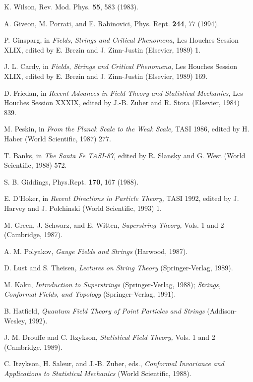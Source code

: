 \begin{thebibliography}{99}

\baselineskip=16pt

 K. Wilson, Rev.
Mod. Phys. {\bf 55}, 583 (1983).

 A. Giveon, M. Porrati, and E. Rabinovici,
Phys. Rept. {\bf 244}, 77 (1994).

 P. Ginsparg, in
{\it Fields, Strings and Critical Phenomena,} Les Houches
Session XLIX, edited by E. Brezin and J. Zinn-Justin
(Elsevier, 1989) 1.

 J. L. Cardy, in
{\it Fields, Strings and Critical Phenomena,} Les Houches
Session XLIX, edited by E. Brezin and J. Zinn-Justin
(Elsevier, 1989) 169. 

 D. Friedan, in
{\it Recent Advances in Field Theory and Statistical
Mechanics,} Les Houches Session XXXIX, edited by
J.-B. Zuber and R. Stora (Elsevier, 1984) 839.

 M. Peskin, in {\it From the Planck
Scale to the Weak Scale,} TASI 1986, edited by H. Haber
(World Scientific, 1987) 277.

 T. Banks, in {\it The Santa Fe
TASI-87,} edited by R. Slansky and G. West (World
Scientific, 1988) 572.

 S. B. Giddings, Phys.Rept.
{\bf 170}, 167 (1988).

 E. D'Hoker, in {\it Recent Directions in
Particle Theory,} TASI 1992, edited by J. Harvey and
J. Polchinski (World Scientific, 1993) 1.

 M. Green, J. Schwarz, and E. Witten, {\it
Superstring Theory,} Vols. 1 and 2 (Cambridge, 1987).

 A. M. Polyakov, {\it Gauge Fields and
Strings} (Harwood, 1987).

 D. Lust and S. Theisen, {\it Lectures on
String Theory} (Springer-Verlag, 1989).

 M. Kaku, {\it Introduction to Superstrings}
(Springer-Verlag, 1988);
{\it Strings, Conformal Fields, and
Topology} (Springer-Verlag, 1991).

 B. Hatfield, {\it Quantum Field Theory of
Point Particles and Strings} (Addison-Wesley, 1992).

 J. M. Drouffe and C. Itzykson,
{\it Statistical Field Theory,} Vols. 1 and 2 (Cambridge,
1989).

 C. Itzykson, H. Saleur, and J.-B. Zuber,
eds., {\it Conformal Invariance and Applications to
Statistical Mechanics} (World Scientific, 1988).


\end{thebibliography}
